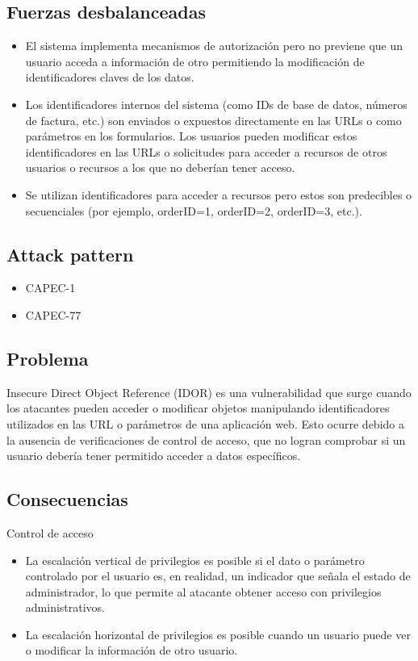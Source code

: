 \subsection*{Fuerzas desbalanceadas}
\begin{itemize}
    \item El sistema implementa mecanismos de autorización pero no previene que un usuario acceda a información de otro permitiendo la modificación de identificadores claves de los datos. 
    \item Los identificadores internos del sistema (como IDs de base de datos, números de factura, etc.) son enviados o expuestos directamente en las URLs o como parámetros en los formularios. Los usuarios pueden modificar estos identificadores en las URLs o solicitudes para acceder a recursos de otros usuarios o recursos a los que no deberían tener acceso.
    \item Se utilizan identificadores para acceder a recursos pero estos son predecibles o secuenciales (por ejemplo, orderID=1, orderID=2, orderID=3, etc.). 
\end{itemize}
\subsection*{Attack pattern}
\begin{itemize}
    \item CAPEC-1
    \item CAPEC-77
\end{itemize}

\subsection*{Problema}
Insecure Direct Object Reference (IDOR) es una vulnerabilidad que surge cuando los atacantes pueden acceder o modificar objetos manipulando identificadores utilizados en las URL o parámetros de una aplicación web. Esto ocurre debido a la ausencia de verificaciones de control de acceso, que no logran comprobar si un usuario debería tener permitido acceder a datos específicos.

\subsection*{Consecuencias}
Control de acceso
\begin{itemize}
    \item  La escalación vertical de privilegios es posible si el dato o parámetro controlado por el usuario es, en realidad, un indicador que señala el estado de administrador, lo que permite al atacante obtener acceso con privilegios administrativos.
    \item La escalación horizontal de privilegios es posible cuando un usuario puede ver o modificar la información de otro usuario.
\end{itemize}



